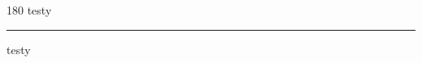
\begin{frame}
\begin{center}
\begin{turn}{180}
{\fontsize{2.5cm}{1em}\selectfont testy}
\end{turn}
\vspace{1em}\par  
\hrule
\vspace{1em}\par  
{\fontsize{2.5cm}{1em}\selectfont testy}
\end{center}
\end{frame}
